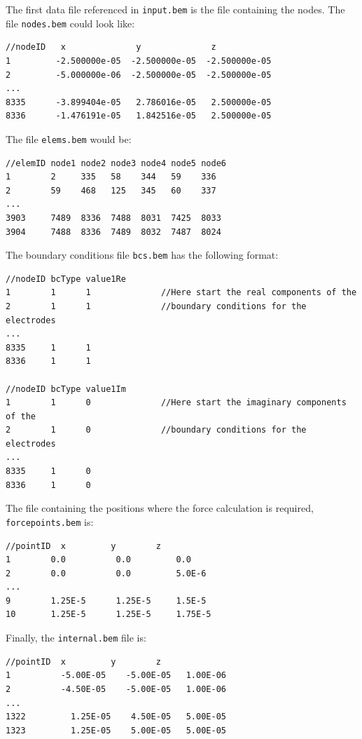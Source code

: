 \documentclass[12pt]{article}
\begin{document}
The first data file referenced in \verb+input.bem+ is the file containing the nodes. The file \verb+nodes.bem+ could look like:

\small\begin{verbatim}
//nodeID   x              y              z
1         -2.500000e-05  -2.500000e-05  -2.500000e-05
2         -5.000000e-06  -2.500000e-05  -2.500000e-05
...
8335      -3.899404e-05   2.786016e-05   2.500000e-05
8336      -1.476191e-05   1.842516e-05   2.500000e-05
\end{verbatim}\normalsize

The file \verb+elems.bem+ would be:

\small\begin{verbatim}
//elemID node1 node2 node3 node4 node5 node6
1        2     335   58    344   59    336
2        59    468   125   345   60    337
...
3903     7489  8336  7488  8031  7425  8033
3904     7488  8336  7489  8032  7487  8024
\end{verbatim}\normalsize

The boundary conditions file \verb+bcs.bem+ has the following format:

\small\begin{verbatim}
//nodeID bcType value1Re
1        1      1              //Here start the real components of the 
2        1      1              //boundary conditions for the electrodes
...
8335     1      1
8336     1      1

//nodeID bcType value1Im
1        1      0              //Here start the imaginary components of the 
2        1      0              //boundary conditions for the electrodes
...
8335     1      0
8336     1      0
\end{verbatim}\normalsize

The file containing the positions where the force calculation is required, \verb+forcepoints.bem+ is:

\small\begin{verbatim}
//pointID  x         y        z
1        0.0	      0.0	      0.0
2        0.0	      0.0	      5.0E-6
...
9        1.25E-5	  1.25E-5	  1.5E-5
10       1.25E-5	  1.25E-5	  1.75E-5
\end{verbatim}\normalsize

Finally, the \verb+internal.bem+ file is:

\small\begin{verbatim}
//pointID  x         y        z
1	       -5.00E-05	-5.00E-05	1.00E-06
2	       -4.50E-05	-5.00E-05	1.00E-06
...
1322	     1.25E-05	 4.50E-05	5.00E-05
1323	     1.25E-05	 5.00E-05	5.00E-05
\end{verbatim}\normalsize
\end{document}
